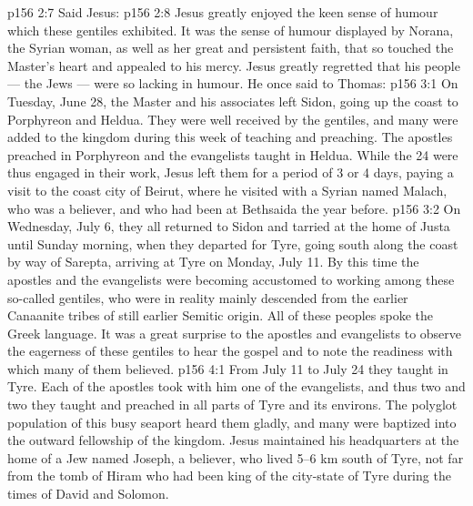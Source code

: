 \vs p156 2:7 Said Jesus: 
\vs p156 2:8 Jesus greatly enjoyed the keen sense of humour which these gentiles exhibited. It was the sense of humour displayed by Norana, the Syrian woman, as well as her great and persistent faith, that so touched the Master’s heart and appealed to his mercy. Jesus greatly regretted that his people --- the Jews --- were so lacking in humour. He once said to Thomas: 
\vs p156 3:1 On Tuesday, June 28, the Master and his associates left Sidon, going up the coast to Porphyreon and Heldua. They were well received by the gentiles, and many were added to the kingdom during this week of teaching and preaching. The apostles preached in Porphyreon and the evangelists taught in Heldua. While the 24 were thus engaged in their work, Jesus left them for a period of 3 or 4 days, paying a visit to the coast city of Beirut, where he visited with a Syrian named Malach, who was a believer, and who had been at Bethsaida the year before.
\vs p156 3:2 On Wednesday, July 6, they all returned to Sidon and tarried at the home of Justa until Sunday morning, when they departed for Tyre, going south along the coast by way of Sarepta, arriving at Tyre on Monday, July 11. By this time the apostles and the evangelists were becoming accustomed to working among these so\hyp{}called gentiles, who were in reality mainly descended from the earlier Canaanite tribes of still earlier Semitic origin. All of these peoples spoke the Greek language. It was a great surprise to the apostles and evangelists to observe the eagerness of these gentiles to hear the gospel and to note the readiness with which many of them believed.
\vs p156 4:1 From July 11 to July 24 they taught in Tyre. Each of the apostles took with him one of the evangelists, and thus two and two they taught and preached in all parts of Tyre and its environs. The polyglot population of this busy seaport heard them gladly, and many were baptized into the outward fellowship of the kingdom. Jesus maintained his headquarters at the home of a Jew named Joseph, a believer, who lived 5--6 km south of Tyre, not far from the tomb of Hiram who had been king of the city\hyp{}state of Tyre during the times of David and Solomon.
